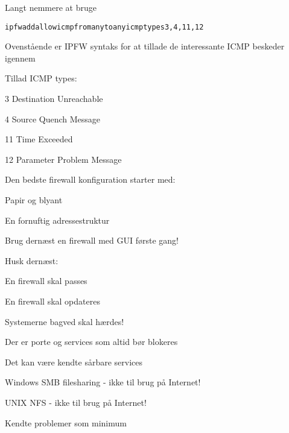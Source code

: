\documentclass[Screen16to9,17pt]{foils}
\begin{document}
Langt nemmere at bruge



\begin{alltt}
ipfw add allow icmp from any to any icmptypes 3,4,11,12
\end{alltt}

\begin{list1}
\item Ovenstående er IPFW syntaks for at tillade de interessante ICMP beskeder igennem
\item Tillad ICMP types:
\begin{list2}
\item 3 Destination Unreachable
\item 4 Source Quench Message
\item 11 Time Exceeded
\item 12 Parameter Problem Message
\end{list2}
\end{list1}


\begin{list1}
\item Den bedste firewall konfiguration starter med:
\begin{list2}
\item Papir og blyant
\item En fornuftig adressestruktur
\end{list2}
\item Brug dernæst en firewall med GUI første gang!
\item Husk dernæst:
\begin{list2}
\item En firewall skal passes
\item En firewall skal opdateres
\item Systemerne bagved skal hærdes!
\end{list2}
\end{list1}





\begin{list1}
\item Der er porte og services som altid bør blokeres
\item Det kan være kendte sårbare services
\begin{list2}
\item Windows SMB filesharing - ikke til brug på Internet!
\item UNIX NFS - ikke til brug på Internet!
\end{list2}
\item Kendte problemer som minimum
\end{list1}
\end{document}
